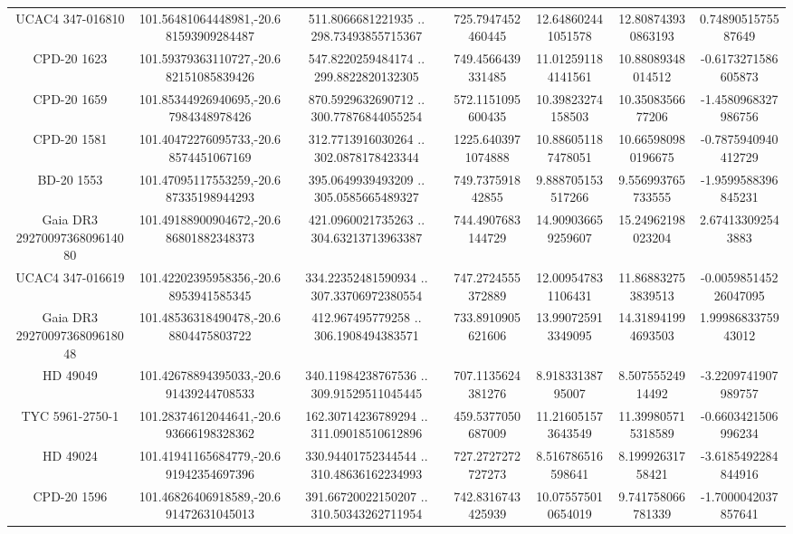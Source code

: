 \begin{table}
\begin{tabular}{ccccccc}
UCAC4 347-016810 & 101.56481064448981,-20.681593909284487 & 511.8066681221935 .. 298.73493855715367 & 725.7947452460445 & 12.648602441051578 & 12.808743930863193 & 0.7489051575587649 \\
CPD-20  1623 & 101.59379363110727,-20.682151085839426 & 547.8220259484174 .. 299.8822820132305 & 749.4566439331485 & 11.012591184141561 & 10.88089348014512 & -0.6173271586605873 \\
CPD-20  1659 & 101.85344926940695,-20.67984348978426 & 870.5929632690712 .. 300.77876844055254 & 572.1151095600435 & 10.39823274158503 & 10.3508356677206 & -1.4580968327986756 \\
CPD-20  1581 & 101.40472276095733,-20.68574451067169 & 312.7713916030264 .. 302.0878178423344 & 1225.6403971074888 & 10.886051187478051 & 10.665980980196675 & -0.7875940940412729 \\
BD-20  1553 & 101.47095117553259,-20.687335198944293 & 395.0649939493209 .. 305.0585665489327 & 749.737591842855 & 9.888705153517266 & 9.556993765733555 & -1.9599588396845231 \\
Gaia DR3 2927009736809614080 & 101.49188900904672,-20.686801882348373 & 421.0960021735263 .. 304.63213713963387 & 744.4907683144729 & 14.909036659259607 & 15.24962198023204 & 2.674133092543883 \\
UCAC4 347-016619 & 101.42202395958356,-20.68953941585345 & 334.22352481590934 .. 307.33706972380554 & 747.2724555372889 & 12.009547831106431 & 11.868832753839513 & -0.005985145226047095 \\
Gaia DR3 2927009736809618048 & 101.48536318490478,-20.68804475803722 & 412.967495779258 .. 306.1908494383571 & 733.8910905621606 & 13.990725913349095 & 14.318941994693503 & 1.9998683375943012 \\
HD  49049 & 101.42678894395033,-20.691439244708533 & 340.11984238767536 .. 309.91529511045445 & 707.1135624381276 & 8.91833138795007 & 8.50755524914492 & -3.2209741907989757 \\
TYC 5961-2750-1 & 101.28374612044641,-20.693666198328362 & 162.30714236789294 .. 311.09018510612896 & 459.5377050687009 & 11.216051573643549 & 11.399805715318589 & -0.6603421506996234 \\
HD  49024 & 101.41941165684779,-20.691942354697396 & 330.94401752344544 .. 310.48636162234993 & 727.2727272727273 & 8.516786516598641 & 8.19992631758421 & -3.6185492284844916 \\
CPD-20  1596 & 101.46826406918589,-20.691472631045013 & 391.66720022150207 .. 310.50343262711954 & 742.8316743425939 & 10.075575010654019 & 9.741758066781339 & -1.7000042037857641 \\

\end{tabular}
\end{table}
